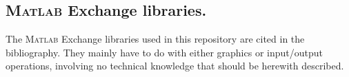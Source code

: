 	\subsection{\textsc{Matlab} Exchange libraries.}
	\indent The \textsc{Matlab} Exchange libraries used in this repository are cited in the bibliography. They mainly have to do with either graphics or input/output operations, involving no technical knowledge that should be herewith described.
	